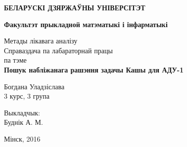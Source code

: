 \begin{titlepage}
    \begin{center}
        {\bf БЕЛАРУСКІ ДЗЯРЖАЎНЫ УНІВЕРСІТЭТ}
    \end{center}
    \begin{center}
        {\bf Факультэт прыкладной матэматыкі і інфарматыкі}
    \end{center}
    
    \vspace{15em}
    
    \begin{center}
        {\LARGE Метады лікавага аналізу} \\
        \vspace{5mm}
        {\LARGE Справаздача па лабараторнай працы} \\
        {\large па тэме} \\
        \vspace{5mm}
        {\bf \LARGE Пошук набліжанага рашэння задачы Кашы для АДУ-1}
    \end{center}
    
    \vspace{12em}
    
    \begin{flushright}
        \LARGE{
        Богдана Уладзіслава\\
        3 курс, 3 група\\}
    \end{flushright}
    
    \vspace{5em}
    
    \begin{flushright}
        \LARGE{
        Выкладчык:\\
        Буднік А. М.\\}
    \end{flushright}
    
    \vfill
    
    \begin{center}
        {\LARGE Мінск, 2016}
    \end{center}
\end{titlepage}
\newpage
